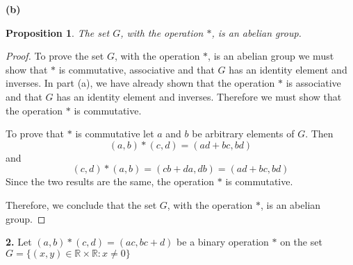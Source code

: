 \documentclass[12pt]{article}   %
\newtheorem*{proposition}{Proposition}  %
\begin{document}
\bigskip
\noindent\textbf{(b)}
\begin{proposition}
The set $G$, with the operation $\ast$, is an abelian group.
\end{proposition}
\begin{proof}
To prove the set $G$, with the operation $\ast$, is an abelian group we must show that $\ast$ is commutative, associative and that $G$ has an identity element and inverses. In part (a), we have already shown that the operation $*$ is associative and that $G$ has an identity element and inverses. Therefore we must show that the operation $*$ is commutative.

To prove that $*$ is commutative let $a$ and $b$ be arbitrary elements of $G$. Then
\begin{equation*}
(a,b)*(c,d) = (ad + bc, bd)
\end{equation*}
and
\begin{equation*}
(c,d)*(a,b) = (cb +da,db) = (ad + bc, bd)
\end{equation*}
Since the two results are the same, the operation $\ast$ is commutative.

Therefore, we conclude that the set $G$, with the operation $\ast$, is an abelian group.
\end{proof}

\noindent\textbf{2.} \quad Let $(a,b)*(c,d) = (ac, bc + d)$ be a binary operation $*$ on the set $G = \{(x,y) \in \mathbb{R} \times \mathbb{R}: x \neq 0\}$ \\
\end{document}
